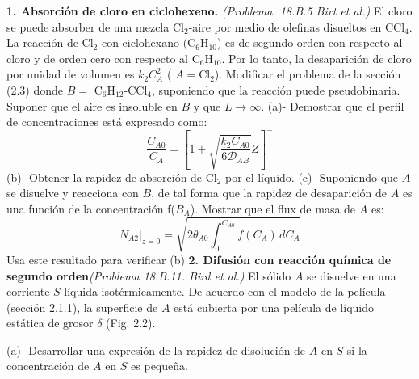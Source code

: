 \textbf{1. Absorción de cloro en ciclohexeno.} \textit{(Problema. 18.B.5 Birt et al.)}
\flushleft
El cloro se puede absorber de una mezcla Cl$_2$-aire por medio de olefinas disueltos en CCl$_4$. La reacción de Cl$_2$ con ciclohexano (C$_{6}$H$_{10}$) es de segundo orden con respecto al cloro y de orden cero con respecto al C$_{6}$H$_{10}$. Por lo tanto, la desaparición de cloro por unidad de volumen es $k_2 C_A^2$ ( $A = \text{Cl}_2$).
\flushleft
Modificar el problema de la sección (2.3) donde $B =$ C$_{6}$H$_{12}$-CCl$_4$, suponiendo que la reacción puede pseudobinaria. Suponer que el aire es insoluble en $B$ y que $L \to \infty$.
\flushleft
(a)- Demostrar que el perfil de concentraciones está expresado como:
 \[ 
 \frac{C_{A0}}{C_{A}} = \left[1 + \sqrt{\frac{k_2 C_{A0}}{6\mathscr{D}_{AB}}} Z \right]^{-}
    \]
(b)- Obtener la rapidez de absorción de Cl$_2$ por el líquido.
\flushleft
(c)- Suponiendo que $A$ se disuelve y reacciona con $B$, de tal forma que la rapidez de desaparición de $A$ es una función de la concentración f($B_A$). Mostrar que el flux de masa de $A$ es:
\[
N_{A2} \bigg|_{z=0} = \sqrt{2 \theta_{A0} \int_{0}^{C_{A0}} f(C_A) \, dC_A}
\]
Usa este resultado para verificar (b)
\flushleft
\textbf{2.  Difusión con reacción química de segundo orden}\textit{(Problema 18.B.11. Bird et al.)}
\flushleft
El sólido $A$ se disuelve en una corriente $S$ líquida isotérmicamente. De acuerdo con el modelo de la película (sección 2.1.1), la superficie de $A$ está cubierta por una película de líquido estática de grosor $\delta$ (Fig. 2.2).

(a)- Desarrollar una expresión de la rapidez de disolución de $A$ en $S$ si la concentración de $A$ en $S$ es pequeña.


